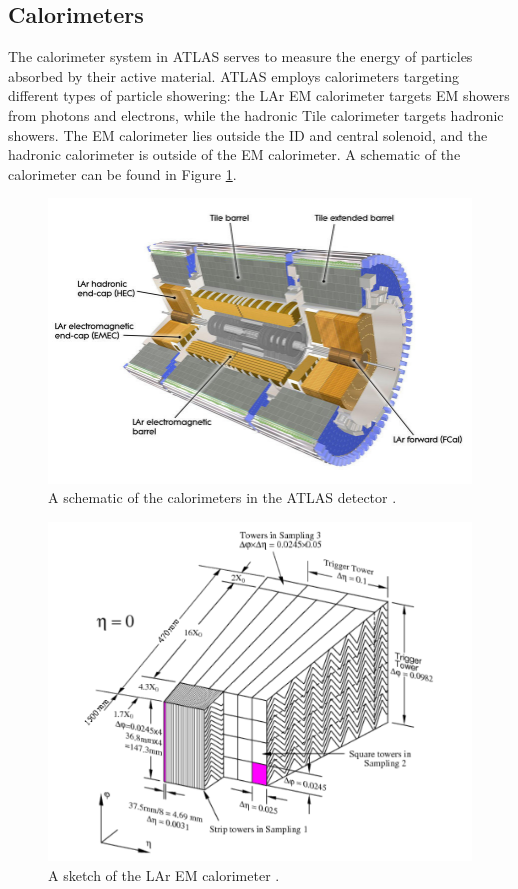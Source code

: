 \subsection{Calorimeters} \label{ssec:calorimeters}
The calorimeter system in ATLAS serves to measure the energy of particles absorbed by their active material. ATLAS employs calorimeters targeting different types of particle showering: the \gls{LAr} \gls{EM} calorimeter targets \gls{EM} showers from photons and electrons, while the hadronic Tile calorimeter targets hadronic showers. The \gls{EM} calorimeter lies outside the \gls{ID} and central solenoid, and the hadronic calorimeter is outside of the \gls{EM} calorimeter.  A schematic of the calorimeter can be found in Figure \ref{fig:calorimeter}.


\begin{figure}[!ht]
    \centering
    \includegraphics[width=.7\textwidth]{chapters/chapter2_experiment/images/calorimeter.jpeg}
    \caption[A schematic of the calorimeters in the ATLAS detector]{A schematic of the calorimeters in the ATLAS detector \cite{atlas-experiment}.}
    \label{fig:calorimeter}
\end{figure}

\begin{figure}[!ht]
    \centering
    \includegraphics[width=.9\textwidth]{chapters/chapter2_experiment/images/lar.png}
    \caption[A sketch of the \gls{LAr} \gls{EM} calorimeter]{A sketch of the \gls{LAr} \gls{EM} calorimeter \cite{lar-tdr}.}
    \label{fig:lar}
\end{figure}

